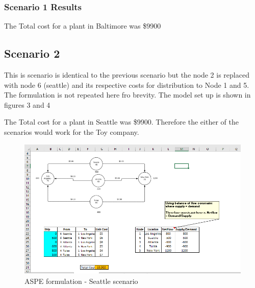 \documentclass[]{article}
\begin{document}
\subsubsection{Scenario 1 Results}\label{scenario-1-results}

The Total cost for a plant in Baltimore was \$9900

\pagebreak

\subsection{Scenario 2}\label{scenario-2}

This is scenario is identical to the previous scenario but the node 2 is
replaced with node 6 (seattle) and its respective costs for distribution
to Node 1 and 5. The formulation is not repeated here fro brevity. The
model set up is shown in figures 3 and 4

The Total cost for a plant in Seattle was \$9900. Therefore the either
of the scenarios would work for the Toy company.

\begin{figure}[h]

{\centering \includegraphics{Figures/Homework3/p1b} 

}

\caption{ASPE formulation - Seattle scenario}\label{fig:unnamed-chunk-4}
\end{figure}
\end{document}

